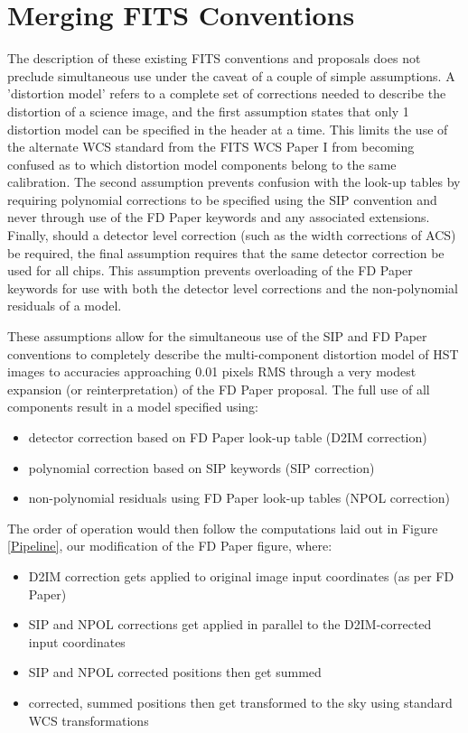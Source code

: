 \documentclass[11pt,twoside]{article}
\begin{document}
\section{Merging FITS Conventions}
The description of these existing FITS conventions and proposals does not preclude simultaneous use under the caveat of a couple of simple assumptions.  A 'distortion model' refers to a complete set of corrections needed to describe the distortion of a science image, and the first assumption states that only 1 distortion model can be specified in the header at a time. This limits the use of the alternate WCS standard from the FITS WCS Paper I from becoming confused as to which distortion model components belong to the same calibration. The second assumption prevents confusion with the look-up tables by requiring polynomial corrections to be specified using the SIP convention and never through use of the FD Paper keywords and any associated extensions. Finally, should a detector level correction (such as the width corrections of ACS) be required, the final assumption requires that the same detector correction be used for all chips. This assumption prevents overloading of the FD Paper keywords for use with both the detector level corrections and the non-polynomial residuals of a model. 

These assumptions allow for the simultaneous use of the SIP and FD Paper conventions to completely describe the multi-component distortion model of HST images to accuracies approaching 0.01 pixels RMS through a very modest expansion (or reinterpretation) of the FD Paper proposal. The full use of all components result in a model specified using:
\begin{itemize}
\item detector correction based on FD Paper look-up table (D2IM correction)
\item polynomial correction based on SIP keywords (SIP correction)
\item non-polynomial residuals using FD Paper look-up tables (NPOL correction)
\end{itemize}
The order of operation would then follow the computations laid out in Figure \ref{Pipeline}, our modification of the FD Paper figure, where:
\begin{itemize}
\item D2IM correction gets applied to original image input coordinates (as per FD Paper)
\item SIP and NPOL corrections get applied in parallel to the D2IM-corrected input coordinates
\item SIP and NPOL corrected positions then get summed 
\item corrected, summed positions then get transformed to the sky using standard WCS transformations
\end{itemize}
\end{document}
